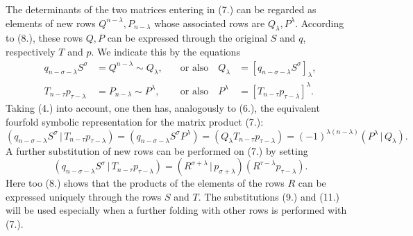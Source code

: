 \documentclass[11pt]{article}
\newcommand{\pair}[2]{(#1\,|\,#2)}
\begin{document}
The determinants of the two matrices entering in (7.) can be regarded as elements of new rows $Q^{n-\lambda},P_{n-\lambda}$ whose associated rows are $Q_\lambda,P^\lambda$. According to (8.), these rows $Q,P$ can be expressed through the original $S$ and $q$, respectively $T$ and $p$. We indicate this by the equations
\begin{equation}
\begin{aligned}
 q_{n-\sigma-\lambda}S^\sigma&=Q^{n-\lambda}\sim Q_\lambda, &\quad\text{or also}\quad Q_\lambda&=[q_{n-\sigma-\lambda}S^\sigma]_\lambda,\\
 T_{n-\tau}p_{\tau-\lambda}&=P_{n-\lambda}\sim P^\lambda, &\quad\text{or also}\quad P^\lambda&=[T_{n-\tau}p_{\tau-\lambda}]^\lambda.
\end{aligned}
\tag{9}
\end{equation}
Taking (4.) into account, one then has, analogously to (6.), the equivalent fourfold symbolic representation for the matrix product (7.):
\begin{equation}
\pair{q_{n-\sigma-\lambda}S^\sigma}{T_{n-\tau}p_{\tau-\lambda}}
=(q_{n-\sigma-\lambda}S^\sigma P^\lambda)=(Q_\lambda T_{n-\tau}p_{\tau-\lambda})=(-1)^{\lambda(n-\lambda)}\pair{P^\lambda}{Q_\lambda}.
\tag{10}
\end{equation}
A further substitution of new rows can be performed on (7.) by setting
\begin{equation}
 \pair{q_{n-\sigma-\lambda}S^\sigma}{T_{n-\tau}p_{\tau-\lambda}}
 =\pair{R^{\sigma+\lambda}}{p_{\sigma+\lambda}}(R^{\tau-\lambda}p_{\tau-\lambda}).
\tag{11}
\end{equation}
Here too (8.) shows that the products of the elements of the rows $R$ can be expressed uniquely through the rows $S$ and $T$. The substitutions (9.) and (11.) will be used especially when a further folding with other rows is performed with (7.).
\end{document}
